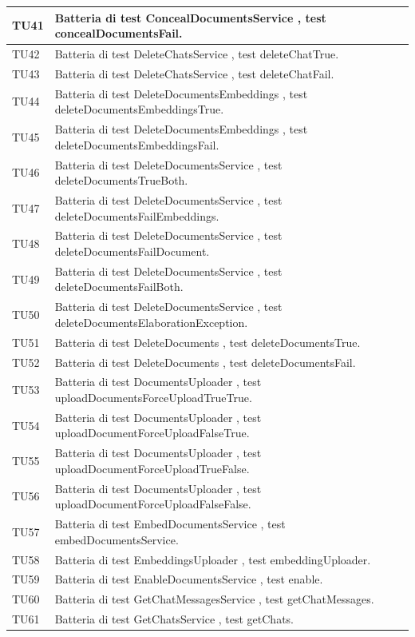 \documentclass[10pt, a4paper]{article}
\begin{document}
\begin{xltabular}{\textwidth}{p{0.12\textwidth}|X}
\hline
TU41 & Batteria di test ConcealDocumentsService , test concealDocumentsFail. \\
\hline
TU42 & Batteria di test DeleteChatsService , test deleteChatTrue. \\
\hline
TU43 & Batteria di test DeleteChatsService , test deleteChatFail. \\
\hline
TU44 & Batteria di test DeleteDocumentsEmbeddings , test deleteDocumentsEmbeddingsTrue. \\
\hline
TU45 & Batteria di test DeleteDocumentsEmbeddings , test deleteDocumentsEmbeddingsFail. \\
\hline
TU46 & Batteria di test DeleteDocumentsService , test deleteDocumentsTrueBoth. \\
\hline
TU47 & Batteria di test DeleteDocumentsService , test deleteDocumentsFailEmbeddings. \\
\hline
TU48 & Batteria di test DeleteDocumentsService , test deleteDocumentsFailDocument. \\
\hline
TU49 & Batteria di test DeleteDocumentsService , test deleteDocumentsFailBoth. \\
\hline
TU50 & Batteria di test DeleteDocumentsService , test deleteDocumentsElaborationException. \\
\hline
TU51 & Batteria di test DeleteDocuments , test deleteDocumentsTrue. \\
\hline
TU52 & Batteria di test DeleteDocuments , test deleteDocumentsFail. \\
\hline
TU53 & Batteria di test DocumentsUploader , test uploadDocumentsForceUploadTrueTrue. \\
\hline
TU54 & Batteria di test DocumentsUploader , test uploadDocumentForceUploadFalseTrue. \\
\hline
TU55 & Batteria di test DocumentsUploader , test uploadDocumentForceUploadTrueFalse. \\
\hline
TU56 & Batteria di test DocumentsUploader , test uploadDocumentForceUploadFalseFalse. \\
\hline
TU57 & Batteria di test EmbedDocumentsService , test embedDocumentsService. \\
\hline
TU58 & Batteria di test EmbeddingsUploader , test embeddingUploader. \\
\hline
TU59 & Batteria di test EnableDocumentsService , test enable. \\
\hline
TU60 & Batteria di test GetChatMessagesService , test getChatMessages. \\
\hline
TU61 & Batteria di test GetChatsService , test getChats. \\

\end{xltabular}
\end{document}
